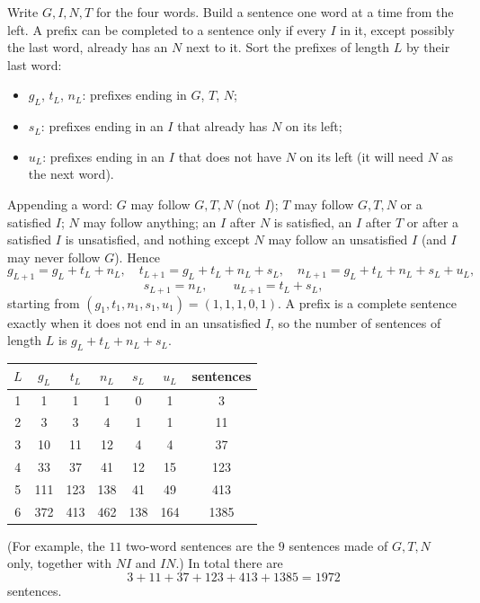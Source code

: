 Write $G,I,N,T$ for the four words. Build a sentence one word at a time from the left. A prefix can be completed to a sentence only if every $I$ in it, except possibly the last word, already has an $N$ next to it. Sort the prefixes of length $L$ by their last word:
\begin{itemize}
\item $g_L$, $t_L$, $n_L$: prefixes ending in $G$, $T$, $N$;
\item $s_L$: prefixes ending in an $I$ that already has $N$ on its left;
\item $u_L$: prefixes ending in an $I$ that does not have $N$ on its left (it will need $N$ as the next word).
\end{itemize}
Appending a word: $G$ may follow $G,T,N$ (not $I$); $T$ may follow $G,T,N$ or a satisfied $I$; $N$ may follow anything; an $I$ after $N$ is satisfied, an $I$ after $T$ or after a satisfied $I$ is unsatisfied, and nothing except $N$ may follow an unsatisfied $I$ (and $I$ may never follow $G$). Hence
\[g_{L+1}=g_L+t_L+n_L,\quad t_{L+1}=g_L+t_L+n_L+s_L,\quad n_{L+1}=g_L+t_L+n_L+s_L+u_L,\]
\[s_{L+1}=n_L,\qquad u_{L+1}=t_L+s_L,\]
starting from $(g_1,t_1,n_1,s_1,u_1)=(1,1,1,0,1)$. A prefix is a complete sentence exactly when it does not end in an unsatisfied $I$, so the number of sentences of length $L$ is $g_L+t_L+n_L+s_L$.
\begin{center}
\begin{tabular}{c|ccccc|c}
$L$ & $g_L$ & $t_L$ & $n_L$ & $s_L$ & $u_L$ & sentences\\ \hline
1 & 1 & 1 & 1 & 0 & 1 & 3\\
2 & 3 & 3 & 4 & 1 & 1 & 11\\
3 & 10 & 11 & 12 & 4 & 4 & 37\\
4 & 33 & 37 & 41 & 12 & 15 & 123\\
5 & 111 & 123 & 138 & 41 & 49 & 413\\
6 & 372 & 413 & 462 & 138 & 164 & 1385
\end{tabular}
\end{center}
(For example, the $11$ two-word sentences are the $9$ sentences made of $G,T,N$ only, together with $NI$ and $IN$.) In total there are
\[3+11+37+123+413+1385=\boxed{1972}\]
sentences.
